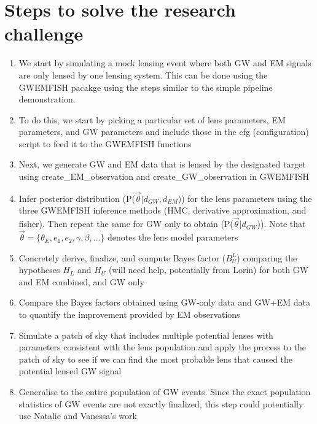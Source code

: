 \documentclass[pdflatex,sn-mathphys-num]{sn-jnl}%
\theoremstyle{thmstyleone}%
\theoremstyle{thmstyletwo}%
\theoremstyle{thmstylethree}%
\begin{document}
\section{Steps to solve the research challenge}
\begin{enumerate}
	\item We start by simulating a mock lensing event where both GW and EM signals are only lensed by one lensing system. 
This can be done using the GWEMFISH pacakge using the steps similar to the simple pipeline demonstration.
	\item To do this, we start by picking a particular set of lens parameters, EM parameters, and GW parameters and include those in the cfg (configuration) script to feed it to the GWEMFISH functions
	\item Next, we generate GW and EM data that is lensed by the designated target using create\_EM\_observation and create\_GW\_observation in GWEMFISH
	\item Infer posterior distribution (P($\vec{\theta} \vert d_{GW}, d_{EM}$)) for the lens parameters using the three GWEMFISH inference methods (HMC, derivative approximation, and fisher). 
Then repeat the same for GW only to obtain (P($\vec{\theta} \vert d_{GW}$)). 
Note that $\vec{\theta} = \{\theta_E, e_1, e_2, \gamma, \beta, \ldots\}$ denotes the lens model parameters
	\item Concretely derive, finalize, and compute Bayes factor ($B^L_U$) comparing the hypotheses $H_L$ and $H_U$ (will need help, potentially from Lorin) for both GW and EM combined, and GW only
	\item Compare the Bayes factors obtained using GW-only data and GW+EM data to quantify the improvement provided by EM observations
	\item Simulate a patch of sky that includes multiple potential lenses with parameters consistent with the lens population and apply the process to the patch of sky to see if we can find the most probable lens that caused the potential lensed GW signal
	\item Generalise to the entire population of GW events. 
Since the exact population statistics of GW events are not exactly finalized, this step could potentially use Natalie and Vanessa's work
\end{enumerate}
\end{document}
